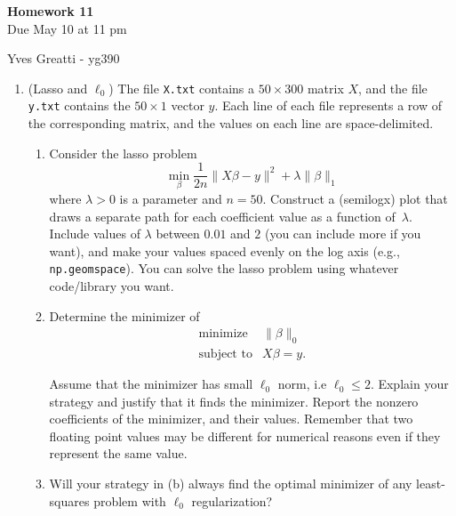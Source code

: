 \documentclass[12pt,twoside]{article}
\begin{document}
\begin{center}
{\large{\textbf{Homework 11}} } \vspace{0.2cm}\\
Due May 10 at 11 pm
\end{center}
Yves Greatti - yg390\\

\begin{enumerate}

\item (Lasso and $\ell_0$)
The file \texttt{X.txt} contains a $50 \times 300$ matrix $X$,
  and the file \texttt{y.txt} contains the $50\times 1$ vector
  $y$.  Each line of each file represents a row of the corresponding
  matrix, and the values on each line are space-delimited.
  \begin{enumerate}
  \item Consider the lasso problem
    $$\min_{\beta} \frac{1}{2n}\|X\beta -y\|^2 + \lambda\|\beta\|_1$$
    where $\lambda>0$ is a parameter and $n=50$.  Construct a (semilogx) plot
    that draws a
    separate path for each coefficient value as a function
    of~$\lambda$.
    Include values of $\lambda$ between $0.01$ and $2$ (you can
    include more if you want),
    and make your values spaced evenly on the log axis (e.g.,
    \texttt{np.geomspace}).  You can solve the lasso problem using
    whatever code/library you want.
  \item Determine the minimizer of
    $$\begin{array}{ll}
    \text{minimize} & \|\beta\|_0\\
    \text{subject to} & X\beta = y.
    \end{array}$$
    
    Assume that the minimizer has small $\ell_0$ norm, i.e $\ell_0 \leq 2$. Explain your strategy and justify that it finds the minimizer.  
    Report the nonzero coefficients of the minimizer, and
    their values.  Remember that two floating point values may be different for numerical reasons even if they represent the same value.
    \item Will your strategy in (b) always find the optimal minimizer of any least-squares problem with $\ell_0$ regularization?
  \end{enumerate}
  

\end{enumerate}
\end{document}
